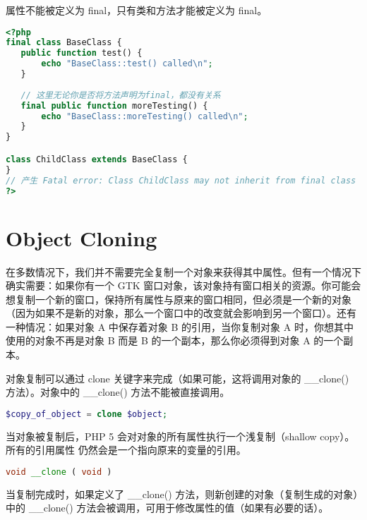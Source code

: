 属性不能被定义为 final，只有类和方法才能被定义为 final。



\begin{lstlisting}[language=PHP]
<?php
final class BaseClass {
   public function test() {
       echo "BaseClass::test() called\n";
   }
   
   // 这里无论你是否将方法声明为final，都没有关系
   final public function moreTesting() {
       echo "BaseClass::moreTesting() called\n";
   }
}

class ChildClass extends BaseClass {
}
// 产生 Fatal error: Class ChildClass may not inherit from final class (BaseClass)
?>
\end{lstlisting}

\chapter{Object Cloning}

在多数情况下，我们并不需要完全复制一个对象来获得其中属性。但有一个情况下确实需要：如果你有一个 GTK 窗口对象，该对象持有窗口相关的资源。你可能会想复制一个新的窗口，保持所有属性与原来的窗口相同，但必须是一个新的对象（因为如果不是新的对象，那么一个窗口中的改变就会影响到另一个窗口）。还有一种情况：如果对象 A 中保存着对象 B 的引用，当你复制对象 A 时，你想其中使用的对象不再是对象 B 而是 B 的一个副本，那么你必须得到对象 A 的一个副本。

对象复制可以通过 clone 关键字来完成（如果可能，这将调用对象的 \_\_clone() 方法）。对象中的 \_\_clone() 方法不能被直接调用。

\begin{lstlisting}[language=PHP]
$copy_of_object = clone $object;
\end{lstlisting}

当对象被复制后，PHP 5 会对对象的所有属性执行一个浅复制（shallow copy）。所有的引用属性 仍然会是一个指向原来的变量的引用。






\begin{lstlisting}[language=PHP]
void __clone ( void )
\end{lstlisting}

当复制完成时，如果定义了 \_\_clone() 方法，则新创建的对象（复制生成的对象）中的 \_\_clone() 方法会被调用，可用于修改属性的值（如果有必要的话）。


